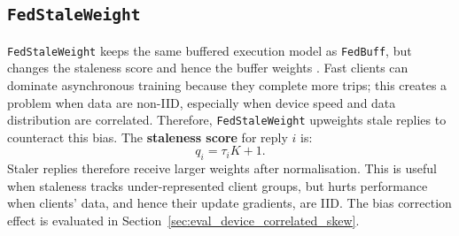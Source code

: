 
\subsection{\texttt{FedStaleWeight}}
\label{sec:fedstaleweight_related}

\texttt{FedStaleWeight} keeps the same buffered execution model as \texttt{FedBuff}, but changes the staleness score and hence the buffer weights \parencite{ma2024fedstaleweight}. Fast clients can dominate asynchronous training because they complete more trips; this creates a problem when data are non-IID, especially when device speed and data distribution are correlated. Therefore, \texttt{FedStaleWeight} upweights stale replies to counteract this bias. The \textbf{staleness score} for reply \(i\) is:
\[
    q_i = \tau_iK + 1.
\]
Staler replies therefore receive larger weights after normalisation. This is useful when staleness tracks under-represented client groups, but hurts performance when clients' data, and hence their update gradients, are IID. The bias correction effect is evaluated in Section~\ref{sec:eval_device_correlated_skew}.


